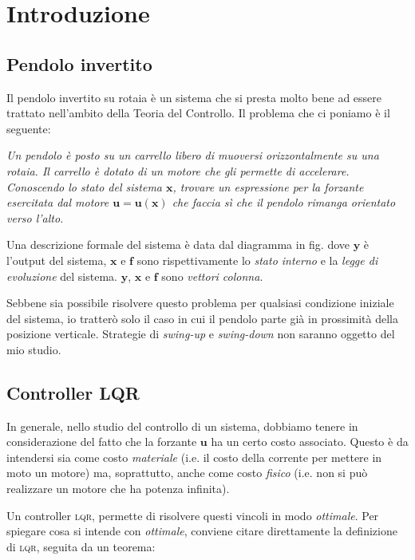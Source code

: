 \section{Introduzione}\label{sec:introduzione}
\subsection{Pendolo invertito}\label{subsec:intro-pendolo}
Il pendolo invertito su rotaia è un sistema che si presta molto bene ad essere trattato nell'ambito della Teoria del
Controllo.
Il problema che ci poniamo è il seguente:
\begin{framed}
\emph{
    Un pendolo è posto su un carrello libero di muoversi orizzontalmente su una rotaia.
    Il carrello è dotato di un motore che gli permette di accelerare. Conoscendo lo stato del sistema
    $\mathbf x$, trovare un espressione per la forzante esercitata dal motore $\mathbf u = \mathbf u(\mathbf x)$ che faccia sì
    che il pendolo rimanga orientato verso l'alto.
  }
\end{framed}

Una descrizione formale del sistema è data dal diagramma in fig. %
dove $\mathbf y$ è l'output del sistema, $\mathbf x$ e $\mathbf f$ sono rispettivamente
lo \emph{stato interno} e la \emph{legge di evoluzione} del sistema. $\mathbf y$, $\mathbf x$ e $\mathbf f$ sono
\emph{vettori colonna}.

Sebbene sia possibile risolvere questo problema per qualsiasi condizione iniziale del sistema, io tratterò solo il
caso in cui il pendolo parte già in prossimità della posizione verticale. Strategie di \emph{swing-up} e
\emph{swing-down} non saranno oggetto del mio studio.


\subsection{Controller \textsc{LQR}}\label{subsec:intro-lqr}
In generale, nello studio del controllo di un sistema, dobbiamo tenere in considerazione del fatto che la forzante
$\mathbf u$ ha un certo costo associato.
Questo è da intendersi sia come costo \emph{materiale} (i.e. il costo della corrente per mettere in moto
un motore) ma, soprattutto, anche come costo \emph{fisico} (i.e. non si può realizzare un motore che ha potenza
infinita).

Un controller \textsc{lqr}, permette di risolvere questi vincoli in modo \emph{ottimale}. %
Per spiegare cosa si intende con \emph{ottimale}, conviene citare direttamente la definizione di \textsc{lqr}, seguita
da un teorema:


